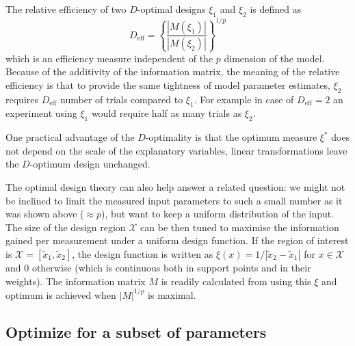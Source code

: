 \documentclass[12pt]{iopart}
\begin{document}
The relative efficiency of two $D$-optimal designs $\xi_1$ and $\xi_2$ is defined as
\begin{equation}
D_\mathrm{eff} = \left\{\frac{|M(\xi_1)|}{|M(\xi_2)|}\right\}^{1/p}
\end{equation}
which is an efficiency measure independent of the $p$ dimension of the model. Because of the additivity of the information matrix, the meaning of the relative efficiency is that to provide the same tightness of model parameter estimates, $\xi_2$ requires $D_\mathrm{eff}$ number of trials compared to $\xi_1$. For example in case of $D_\mathrm{eff} = 2$ an experiment using $\xi_1$ would require half as many trials as $\xi_2$.

One practical advantage of the $D$-optimality is that the optimum measure $\xi^*$ does not depend on the scale of the explanatory variables, linear transformations leave the $D$-optimum design unchanged.

The optimal design theory can also help answer a related question: we might not be inclined to limit the measured input parameters to such a small number as it was shown above ($\approx p$), but want to keep a uniform distribution of the input. The size of the design region $\mathcal{X}$ can be then tuned to maximise the information gained per measurement under a uniform design function. If the region of interest is $\mathcal{X} = [\tilde x_1, \tilde x_2]$, the design function is written as $\xi(x) = 1/{|\tilde x_2 - \tilde x_1|}$ for $x \in \mathcal{X}$ and $0$ otherwise (which is continuous both in support points and in their weights). The information matrix $M$ is readily calculated from  using this $\xi$ and optimum is achieved when $|M|^{1/p}$ is maximal.

\subsection{Optimize for a subset of parameters}
\end{document}
